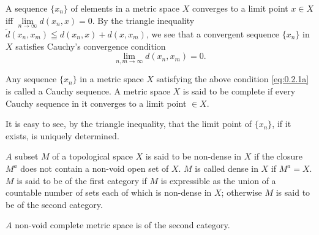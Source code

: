 
A sequence $\{x_{n}\}$ of elements in a metric space $X$ converges to a limit point $x\in X$ iff $\lim\limits_{n\to \infty}d(x_n,x) = 0$. By the triangle inequality $\tilde{d}(x_n,x_m)\leqq d(x_n,x) + d(x,x_m)$, we see that a convergent sequence $\{x_{n}\}$ in $X$ satisfies Cauchy's convergence condition 
\begin{equation}\label{eq:0.2.1a}
\lim\limits _{n, m \rightarrow \infty} d \left(x _{n}, x _{m}\right) = 0.
\end{equation}

\begin{definitionu} Any sequence $\{x_{n}\}$ in a metric space $X$ satisfying the above condition \eqref{eq:0.2.1a} is called a Cauchy sequence. A metric space $X$ is said to be complete if every Cauchy sequence in it converges to a limit point $\in X$. 
\end{definitionu}

It is easy to see, by the triangle inequality, that the limit point of $\{x_{n}\}$, if it exists, is uniquely determined. 

\begin{definitionu} $A$ subset $M$ of a topological space $X$ is said to be non-dense in $X$ if the closure $M^{a}$ does not contain a non-void open set of $X$. $M$ is called dense in $X$ if $M^{a} = X$. $M$ is said to be of the first category if $M$ is expressible as the union of a countable number of sets each of which is non-dense in $X$; otherwise $M$ is said to be of the second category. 
\end{definitionu}


\begin{theoremn} $A$ non-void complete metric space is of the second category. 
\end{theoremn}

